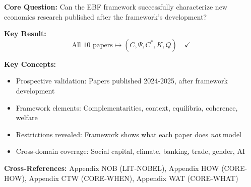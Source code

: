 
\begin{abstract}
This appendix demonstrates the EBF framework's \emph{prospective} application
by analyzing ten papers published in 2024--2025. Unlike the Nobel retrospective
(Appendix NOB), these papers were published \emph{after} the framework was
conceived. This tests the claim that any new economics paper can be
characterized in terms of $(C, \Psi, C^*, K, Q)$. All ten papers map
successfully, with complementarities ($C^{SS}$, $C^{market}$, $C^{F,Political}$),
context dimensions ($\Psi_{neighborhood}$, $\Psi_{policy}$, $\Psi_{inst}$),
and all FEPSDE welfare dimensions appearing across the sample.
\end{abstract}

\begin{tcolorbox}[colback=blue!5!white, colframe=blue!75!black,
    title=Quick Reference: Recent Papers Integration]

\textbf{Core Question:} Can the EBF framework successfully characterize new
economics research published after the framework's development?

\textbf{Key Result:}
\begin{equation}
\text{All 10 papers} \mapsto (C, \Psi, C^*, K, Q) \quad \checkmark
\end{equation}

\textbf{Key Concepts:}
\begin{itemize}[nosep]
\item Prospective validation: Papers published 2024-2025, after framework development
\item Framework elements: Complementarities, context, equilibria, coherence, welfare
\item Restrictions revealed: Framework shows what each paper does \emph{not} model
\item Cross-domain coverage: Social capital, climate, banking, trade, gender, AI
\end{itemize}

\textbf{Cross-References:} Appendix NOB (LIT-NOBEL), Appendix HOW (CORE-HOW),
Appendix CTW (CORE-WHEN), Appendix WAT (CORE-WHAT)
\end{tcolorbox}



